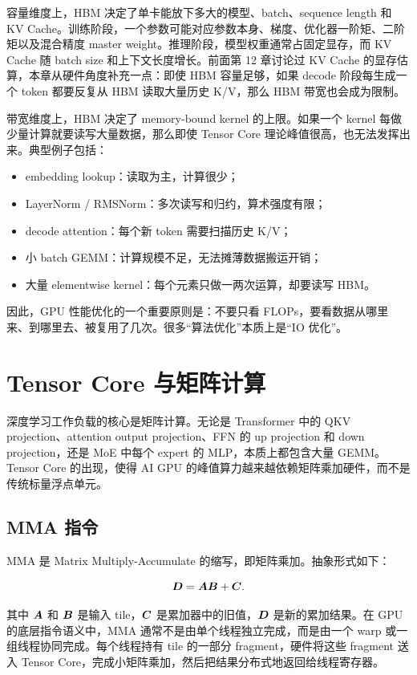容量维度上，HBM 决定了单卡能放下多大的模型、batch、sequence length 和 KV Cache。训练阶段，一个参数可能对应参数本身、梯度、优化器一阶矩、二阶矩以及混合精度 master weight。推理阶段，模型权重通常占固定显存，而 KV Cache 随 batch size 和上下文长度增长。前面第 12 章讨论过 KV Cache 的显存估算，本章从硬件角度补充一点：即使 HBM 容量足够，如果 decode 阶段每生成一个 token 都要反复从 HBM 读取大量历史 K/V，那么 HBM 带宽也会成为限制。

带宽维度上，HBM 决定了 memory-bound kernel 的上限。如果一个 kernel 每做少量计算就要读写大量数据，那么即使 Tensor Core 理论峰值很高，也无法发挥出来。典型例子包括：

\begin{itemize}
  \item embedding lookup：读取为主，计算很少；
  \item LayerNorm / RMSNorm：多次读写和归约，算术强度有限；
  \item decode attention：每个新 token 需要扫描历史 K/V；
  \item 小 batch GEMM：计算规模不足，无法摊薄数据搬运开销；
  \item 大量 elementwise kernel：每个元素只做一两次运算，却要读写 HBM。
\end{itemize}

因此，GPU 性能优化的一个重要原则是：不要只看 FLOPs，要看数据从哪里来、到哪里去、被复用了几次。很多“算法优化”本质上是“IO 优化”。

\section{Tensor Core 与矩阵计算}
\label{sec:tensor-core-matrix}

深度学习工作负载的核心是矩阵计算。无论是 Transformer 中的 QKV projection、attention output projection、FFN 的 up projection 和 down projection，还是 MoE 中每个 expert 的 MLP，本质上都包含大量 GEMM。Tensor Core 的出现，使得 AI GPU 的峰值算力越来越依赖矩阵乘加硬件，而不是传统标量浮点单元。

\subsection{MMA 指令}
\label{subsec:mma}

MMA 是 Matrix Multiply-Accumulate 的缩写，即矩阵乘加。抽象形式如下：

\[
  \bm{D} = \bm{A}\bm{B} + \bm{C}.
\]

其中 $\bm{A}$ 和 $\bm{B}$ 是输入 tile，$\bm{C}$ 是累加器中的旧值，$\bm{D}$ 是新的累加结果。在 GPU 的底层指令语义中，MMA 通常不是由单个线程独立完成，而是由一个 warp 或一组线程协同完成。每个线程持有 tile 的一部分 fragment，硬件将这些 fragment 送入 Tensor Core，完成小矩阵乘加，然后把结果分布式地返回给线程寄存器。

